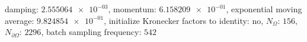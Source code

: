 damping: $\num[scientific-notation=true]{2.555064e-03}$, momentum: $\num[scientific-notation=true]{6.158209e-01}$, exponential moving average: $\num[scientific-notation=true]{9.824854e-01}$, initialize Kronecker factors to identity: $\text{no}$, $N_{\Omega}$: $\num[scientific-notation=false]{156}$, $N_{\partial\Omega}$: $\num[scientific-notation=false]{2296}$, batch sampling frequency: $\num[scientific-notation=false]{542}$